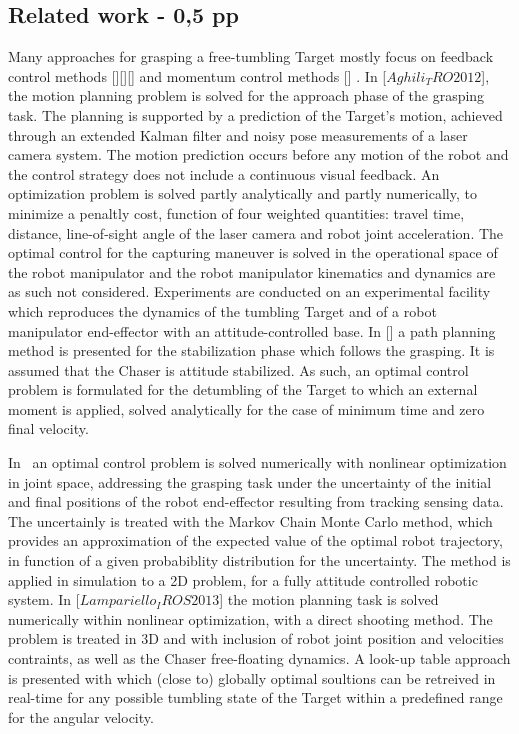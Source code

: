 \subsection{Related work - 0,5 pp}
%
Many approaches for grasping a free-tumbling Target mostly focus on feedback control methods [][][]%
and momentum control methods []%
. In [$Aghili_TRO2012$], the motion planning problem is solved for the approach phase of the grasping task. The planning is supported by a prediction of the Target's motion, achieved through an extended Kalman filter and noisy pose measurements of a laser camera system. The motion prediction occurs before any motion of the robot and the control strategy does not include a continuous visual feedback. An optimization problem is solved partly analytically and partly numerically, to minimize a penaltly cost, function of four weighted quantities: travel time, distance, line-of-sight angle of the laser camera and robot joint acceleration. The optimal control for the capturing maneuver is solved in the operational space of the robot manipulator and the robot manipulator kinematics and dynamics are as such not considered. Experiments are conducted on an experimental facility which reproduces the dynamics of the tumbling Target and of a robot manipulator end-effector with an attitude-controlled base. In []%
a path planning method is presented for the stabilization phase which follows the grasping. It is assumed that the Chaser is attitude stabilized. As such, an optimal control problem is formulated for the detumbling of the Target to which an external moment is applied, solved analytically for the case of minimum time and zero final velocity.

In~\cite{Flores-Abad} an optimal control problem is solved numerically with nonlinear optimization in joint space, addressing the grasping task under the uncertainty of the initial and final positions of the robot end-effector resulting from tracking sensing data. The uncertainly is treated with the Markov Chain Monte Carlo method, which provides an approximation of the expected value of the optimal robot trajectory, in function of a given probabiblity distribution for the uncertainty. The method is applied in simulation to a 2D problem, for a fully attitude controlled robotic system. In [$Lampariello_IROS2013$] the motion planning task is solved numerically within nonlinear optimization, with a direct shooting method. The problem is treated in 3D and with inclusion of robot joint position and velocities contraints, as well as the Chaser free-floating dynamics. A look-up table approach is presented with which (close to) globally optimal soultions can be retreived in real-time for any possible tumbling state of the Target within a predefined range for the angular velocity. 

